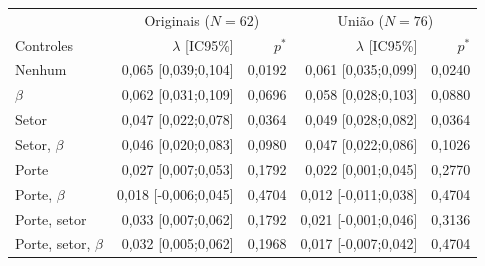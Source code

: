 \begin{tabular}{lrrrr}
\toprule
 & \multicolumn{2}{c}{Originais ($N=62$)} & \multicolumn{2}{c}{União ($N=76$)}\\ Controles & $\lambda$ [IC95\%] & $p^*$ & $\lambda$ [IC95\%] & $p^*$\\
\midrule
Nenhum & 0,065 [0,039;0,104] & 0,0192 & 0,061 [0,035;0,099] & 0,0240\\
$\beta$ & 0,062 [0,031;0,109] & 0,0696 & 0,058 [0,028;0,103] & 0,0880\\
Setor & 0,047 [0,022;0,078] & 0,0364 & 0,049 [0,028;0,082] & 0,0364\\
Setor, $\beta$ & 0,046 [0,020;0,083] & 0,0980 & 0,047 [0,022;0,086] & 0,1026\\
Porte & 0,027 [0,007;0,053] & 0,1792 & 0,022 [0,001;0,045] & 0,2770\\
Porte, $\beta$ & 0,018 [-0,006;0,045] & 0,4704 & 0,012 [-0,011;0,038] & 0,4704\\
Porte, setor & 0,033 [0,007;0,062] & 0,1792 & 0,021 [-0,001;0,046] & 0,3136\\
Porte, setor, $\beta$ & 0,032 [0,005;0,062] & 0,1968 & 0,017 [-0,007;0,042] & 0,4704\\
\bottomrule
\end{tabular}
